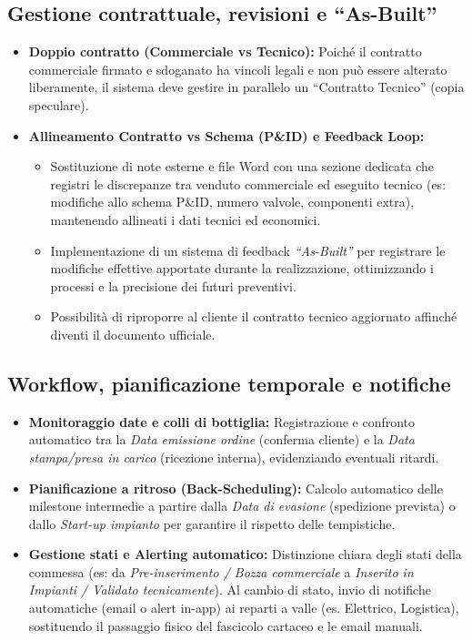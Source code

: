 \subsection{Gestione contrattuale, revisioni e ``As-Built''}
\begin{itemize}
      \item \textbf{Doppio contratto (Commerciale vs Tecnico):} Poiché il contratto commerciale firmato e sdoganato ha
            vincoli legali e non può essere alterato liberamente, il sistema deve gestire in parallelo un ``Contratto Tecnico''
            (copia speculare).
      \item \textbf{Allineamento Contratto vs Schema (P\&ID) e Feedback Loop:}
            \begin{itemize}
                  \item Sostituzione di note esterne e file Word con una sezione dedicata che registri le discrepanze tra
                        venduto commerciale ed eseguito tecnico (es: modifiche allo schema P\&ID, numero valvole, componenti extra),
                        mantenendo allineati i dati tecnici ed economici.
                  \item Implementazione di un sistema di feedback \textit{``As-Built''} per registrare le
                        modifiche effettive apportate durante la realizzazione, ottimizzando i processi e la precisione dei futuri preventivi.
                  \item Possibilità di riproporre al cliente il contratto tecnico aggiornato affinché diventi
                        il documento ufficiale.
            \end{itemize}
\end{itemize}

\subsection{Workflow, pianificazione temporale e notifiche}
\begin{itemize}
      \item \textbf{Monitoraggio date e colli di bottiglia:} Registrazione e confronto automatico
            tra la \textit{Data emissione ordine}
            (conferma cliente) e la \textit{Data stampa/presa in carico} (ricezione interna), evidenziando eventuali ritardi.
      \item \textbf{Pianificazione a ritroso (Back-Scheduling):} Calcolo automatico delle milestone intermedie a partire dalla
            \textit{Data di evasione} (spedizione prevista) o dallo \textit{Start-up impianto}
            per garantire il rispetto delle tempistiche.
      \item \textbf{Gestione stati e Alerting automatico:} Distinzione chiara degli stati della commessa
            (es: da \textit{Pre-inserimento / Bozza commerciale} a \textit{Inserito in Impianti / Validato tecnicamente}).
            Al cambio di stato, invio di notifiche automatiche (email o alert in-app) ai reparti a valle (es. Elettrico, Logistica),
            sostituendo il passaggio fisico del fascicolo cartaceo e le email manuali.
\end{itemize}

